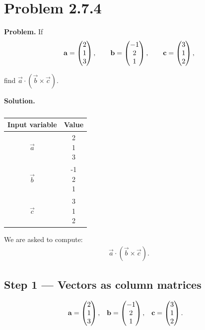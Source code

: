 \documentclass[12pt]{article}
\begin{document}
\section*{Problem 2.7.4}

\textbf{Problem.}
If
\begin{align}
\mathbf a = \begin{pmatrix}2 \\1 \\3\end{pmatrix},\qquad
\mathbf b = \begin{pmatrix}-1 \\2 \\1\end{pmatrix},\qquad
\mathbf c = \begin{pmatrix}3 \\1 \\2\end{pmatrix},
\end{align}

find $\vec a\cdot(\vec b\times\vec c)$.


\textbf{Solution.}

\begin{table}[H]
\centering
\begin{tabular}[12pt]{ |c| c|}
    \hline
    \textbf{Input variable} & \textbf{Value}\\ 
    \hline
    $\vec{a}$ & \myvec{2 \\1 \\3} \\
    \hline 
    $\vec{b}$ & \myvec{-1 \\2 \\1}\\
    \hline
    $\vec{c}$ & \myvec{3 \\1 \\2}\\
    \hline
    \end{tabular}
    \caption{}
    \label{}
 \end{table}

We are asked to compute:
\begin{align}
\vec{a} \cdot (\vec{b} \times \vec{c}).
\end{align}

\subsection*{Step 1 — Vectors as column matrices}
\begin{align}
\mathbf{a} &= \begin{pmatrix}2\\1\\3\end{pmatrix}, &
\mathbf{b} &= \begin{pmatrix}-1\\2\\1\end{pmatrix}, &
\mathbf{c} &= \begin{pmatrix}3\\1\\2\end{pmatrix}.
\end{align}
\end{document}
